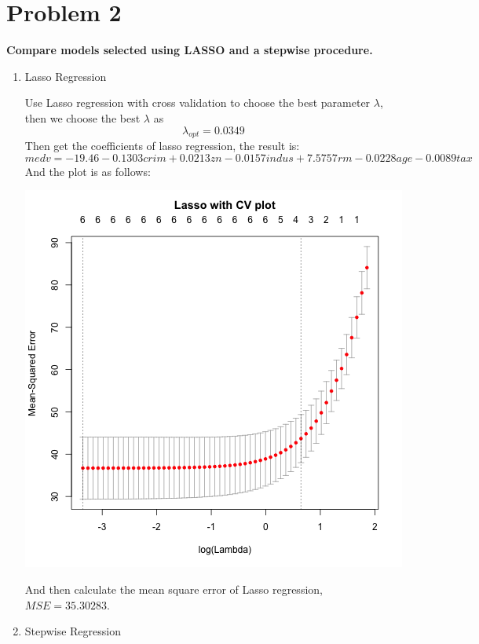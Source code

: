 \documentclass[10pt,letterpaper]{article}
\begin{document}
\section*{Problem 2}
\textbf{Compare models selected using LASSO and a stepwise procedure.}\\
\begin{enumerate}[leftmargin=0cm,itemindent=.5cm,labelwidth=\itemindent,labelsep=0cm,align=left]
\item[\textbullet] Lasso Regression

Use Lasso regression with cross validation to choose the best parameter $\lambda$, then we choose the best $\lambda$ as \[\lambda_{opt} =0.0349\] Then get the coefficients of lasso regression, the result is: 
\[medv = -19.46 - 0.1303crim +  0.0213zn - 0.0157indus +  7.5757rm - 0.0228age - 0.0089tax\] 
And the plot is as follows:
\begin{center}
\includegraphics[scale=0.8]{lasso}
\end{center}
And then calculate the mean square error of Lasso regression, $MSE = 35.30283$.\\

\item[\textbullet] Stepwise Regression


\end{enumerate}
\end{document}
